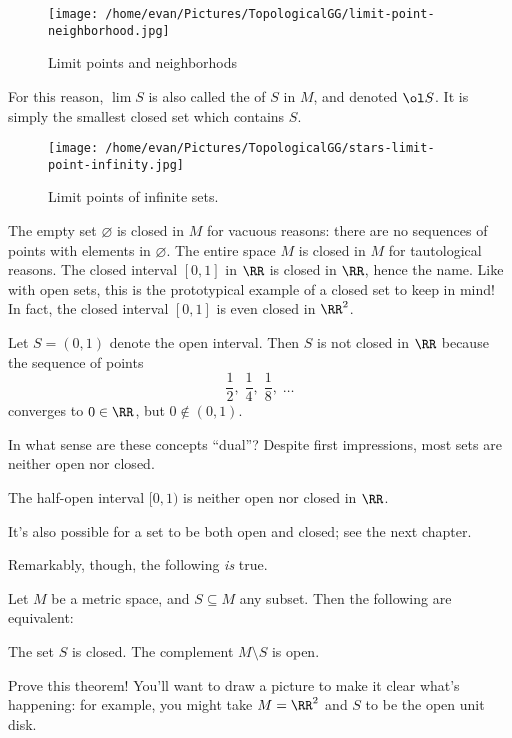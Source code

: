 \begin{figure}[ht]
	\centering
	\texttt{[image: /home/evan/Pictures/TopologicalGG/limit-point-neighborhood.jpg]}
	\caption{Limit points and neighborhods}
\end{figure}

For this reason, $\lim S$ is also called the  of $S$ in $M$,
and denoted $\ol S$.  It is simply the smallest closed set which contains $S$.
\begin{figure}[ht]
	\centering
	\texttt{[image: /home/evan/Pictures/TopologicalGG/stars-limit-point-infinity.jpg]}
	\caption{Limit points of infinite sets.}
\end{figure}

\begin{example}
	\listhack
	\begin{enumerate}[(a)]
		\ii The empty set $\varnothing$ is closed in $M$ for vacuous reasons: there are no sequences of points with elements in $\varnothing$.
		\ii The entire space $M$ is closed in $M$ for tautological reasons.
		\ii The closed interval $[0,1]$ in $\RR$ is closed in $\RR$, hence the name.  Like with open sets, this is the prototypical example of a closed set to keep in mind!
		\ii In fact, the closed interval $[0,1]$ is even closed in $\RR^2$.
	\end{enumerate}
\end{example}
\begin{example}
	Let $S=(0,1)$ denote the open interval.
	Then $S$ is not closed in $\RR$
	because the sequence of points
	\[
		\frac12, \;
		\frac14, \;
		\frac18, \;
		\dots
	\]
	converges to $0 \in \RR$, but $0 \notin (0,1)$.
\end{example}

In what sense are these concepts ``dual''?
Despite first impressions, most sets are neither open nor closed.
\begin{example}
	The half-open interval $[0,1)$ is neither open nor closed in $\RR$.
\end{example}
\begin{remark}
	It's also possible for a set to be both open and closed;
	see the next chapter.
\end{remark}

Remarkably, though, the following \emph{is} true.
\begin{theorem}
	Let $M$ be a metric space, and $S \subseteq M$ any subset.
	Then the following are equivalent:
	\begin{itemize}
		\ii The set $S$ is closed.
		\ii The complement $M \setminus S$ is open.
	\end{itemize}
\end{theorem}
\begin{exercise}
	Prove this theorem!
	You'll want to draw a picture to make it clear what's happening: for example,
	you might take $M = \RR^2$ and $S$ to be the open unit disk.
\end{exercise}

